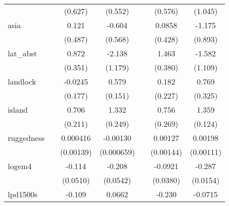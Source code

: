 {\begin{tabular}{l*{6}{c}}
            &                     &     (0.627)         &     (0.552)         &                     &     (0.576)         &     (1.045)         \\
[1em]
asia        &                     &       0.121         &      -0.604         &                     &      0.0858         &      -1.175         \\
            &                     &     (0.487)         &     (0.568)         &                     &     (0.428)         &     (0.893)         \\
[1em]
lat\_abst    &                     &       0.872\sym{*}  &      -2.138         &                     &       1.463\sym{**} &      -1.582         \\
            &                     &     (0.351)         &     (1.179)         &                     &     (0.380)         &     (1.109)         \\
[1em]
landlock    &                     &     -0.0245         &       0.579\sym{**} &                     &       0.182         &       0.769\sym{*}  \\
            &                     &     (0.177)         &     (0.151)         &                     &     (0.227)         &     (0.325)         \\
[1em]
island      &                     &       0.706\sym{**} &       1.332\sym{***}&                     &       0.756\sym{**} &       1.359\sym{***}\\
            &                     &     (0.211)         &     (0.249)         &                     &     (0.269)         &     (0.124)         \\
[1em]
ruggedness  &                     &    0.000416         &    -0.00130         &                     &     0.00127         &     0.00198         \\
            &                     &   (0.00139)         &  (0.000659)         &                     &   (0.00144)         &   (0.00111)         \\
[1em]
logem4      &                     &      -0.114\sym{*}  &      -0.208\sym{**} &                     &     -0.0921\sym{*}  &      -0.287\sym{***}\\
            &                     &    (0.0510)         &    (0.0542)         &                     &    (0.0380)         &    (0.0154)         \\
[1em]
lpd1500s    &                     &      -0.109         &      0.0662         &                     &      -0.230\sym{**} &     -0.0715         \\

\end{tabular}}
